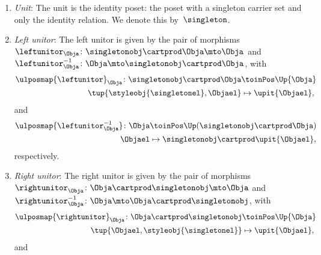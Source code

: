 \begin{lemma}
\begin{enumerate}
        \item \emph{Unit}: The unit is the identity poset: the poset with a singleton carrier set and only the identity relation.
              We denote this by~$\singleton$.
        \item \emph{Left unitor}: The left unitor is given by the pair of morphisms~$\leftunitor_\Obja\colon \singletonobj\cartprod \Obja \mto \Obja$ and~$\leftunitor_\Obja^{-1}\colon \Obja \mto \singletonobj\cartprod \Obja$, with
              \begin{equation}
                  \begin{aligned}
                      \ulposmap{\leftunitor}_\Obja\colon \singletonobj\cartprod \Obja & \toinPos \Up{\Obja} \\
                      \tup{\styleobj{\singletonel},\Objael}                           & \mapsto \upit\{\Objael\},
                  \end{aligned}
              \end{equation}
              and
              \begin{equation}
                  \begin{aligned}
                      \ulposmap{\leftunitor_{\Obja}^{-1}}\colon \Obja & \toinPos \Up(\singletonobj\cartprod \Obja) \\
                      \Objael                                         & \mapsto \singletonobj \cartprod \upit \{\Objael\},
                  \end{aligned}
              \end{equation}
              respectively.
        \item \emph{Right unitor}: The right unitor is given by the pair of morphisms~$\rightunitor_\Obja\colon \Obja\cartprod \singletonobj  \mto \Obja$ and~$\rightunitor_\Obja^{-1}\colon \Obja \mto \Obja \cartprod \singletonobj$, with
              \begin{equation}
                  \begin{aligned}
                      \ulposmap{\rightunitor}_\Obja\colon \Obja\cartprod \singletonobj & \toinPos \Up{\Obja} \\
                      \tup{\Objael,\styleobj{\singletonel}}                            & \mapsto \upit\{\Objael\},
                  \end{aligned}
              \end{equation}
              and
              \begin{equation}
                  \begin{aligned}

\end{aligned}
\end{equation}
\end{enumerate}
\end{lemma}
